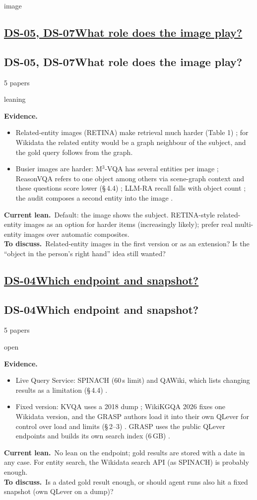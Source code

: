 \documentclass[10pt,a4paper]{article}
\newcommand{\st}[2]{\colorbox{#1}{\footnotesize\strut #2}}
\newcommand{\leaning}{\st{yellow!35}{leaning}}
\newcommand{\open}{\st{red!15}{open}}
\newcommand{\qblock}[1][]{\def\qkey{#1}\qblockx}
\newcommand{\qblockx}[4]{%
  \ifx\qkey\empty
  \subsection*{\underline{#1\quad #2}}%
  \else\hypertarget{\qkey}{}
  \subsection*{#1\quad #2}\fi%
{\footnotesize #3 papers\quad}#4\par}
\newcommand{\ev}{\textbf{Evidence.}}
\newcommand{\lean}{\textbf{Current lean.}}
\newcommand{\ask}{\textbf{To discuss.}}
\begin{document}
\qblock[image]{DS-05, DS-07}{What role does the image play?}{5}{\leaning}
\ev
\begin{itemize}
  \item Related-entity images (RETINA) make retrieval much harder (Table 1)
    \cite{lee2025breaking}; for Wikidata the related entity would be a graph
    neighbour of the subject, and the gold query follows from the graph.
  \item Busier images are harder: M$^3$-VQA has several entities per image
    \cite{ma2026m3}; ReasonVQA refers to one object among others via
    scene-graph context and these questions score lower (\S\,4.4)
    \cite{tran2025reasonvqa}; LLM-RA recall falls with object count
    \cite{jian2024large}; the audit composes a second entity into the image
    \cite{ma2026identifying}.
\end{itemize}
\lean\ Default: the image shows the subject. RETINA-style related-entity
images as an option for harder items (increasingly likely); prefer real
multi-entity images over automatic composites.\\
\ask\ Related-entity images in the first version or as an extension? Is
the ``object in the person's right hand'' idea still wanted?

\qblock{DS-04}{Which endpoint and snapshot?}{5}{\open}
\ev
\begin{itemize}
  \item Live Query Service: SPINACH (60\,s limit) and QAWiki, which lists
    changing results as a limitation (\S\,4.4)
    \cite{liu2024spinach,loustaunau2025qawiki}.
  \item Fixed version: KVQA uses a 2018 dump \cite{shah2019kvqa}; WikiKGQA
    2026 fixes one Wikidata version, and the GRASP authors load it into
    their own QLever for control over load and limits (\S\,2--3)
    \cite{walter2026grasp}. GRASP uses the public QLever endpoints and builds
    its own search index (6\,GB) \cite{walter2025grasp}.
\end{itemize}
\lean\ No lean on the endpoint; gold results are stored with a date in any
case. For entity search, the Wikidata search API (as SPINACH) is probably
enough.\\
\ask\ Is a dated gold result enough, or should agent runs also hit a fixed
snapshot (own QLever on a dump)?
\end{document}
